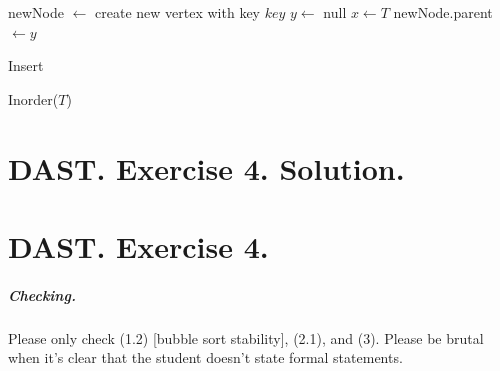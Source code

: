 \begin{algorithm}
\SetAlgoLined
{}
    newNode $\leftarrow$ create new vertex with key $key$\;
    $y \leftarrow$ null\;
    $x \leftarrow T$\;
    newNode.parent $\leftarrow y$\;
\caption{Insert}
\end{algorithm}

%
\begin{algorithm}
\SetAlgoLined
{}
\caption{Inorder($T$)}
\end{algorithm}








 



\setcounter{chapter}{4}
\ifdefined\SOLUTION
  \chapter{DAST. Exercise 4. Solution.}
\else
  \chapter{DAST. Exercise 4.}
\fi

\ifdefined\CHECK


  \paragraph{Checking.} Please only check (1.2) [bubble sort stability], (2.1), and (3). Please be brutal when it's clear that the student doesn't state formal statements.
\paragraph{}

